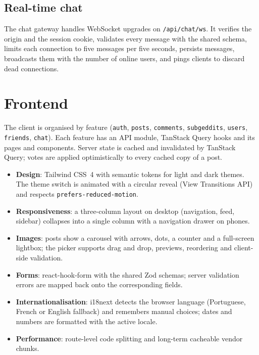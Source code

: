 \documentclass[11pt,a4paper]{article}
\begin{document}
\subsection{Real-time chat}

The chat gateway handles WebSocket upgrades on \texttt{/api/chat/ws}. It verifies the origin and the session cookie,
validates every message with the shared schema, limits each connection to five messages per five seconds,
persists messages, broadcasts them with the number of online users, and pings clients to discard dead connections.

\section{Frontend}

The client is organised by feature (\texttt{auth}, \texttt{posts}, \texttt{comments}, \texttt{subgeddits},
\texttt{users}, \texttt{friends}, \texttt{chat}). Each feature has an API module, TanStack Query hooks and its
pages and components. Server state is cached and invalidated by TanStack Query; votes are applied optimistically
to every cached copy of a post.

\begin{itemize}
  \item \textbf{Design}: Tailwind CSS~4 with semantic tokens for light and dark themes. The theme switch is
        animated with a circular reveal (View Transitions API) and respects \texttt{prefers-reduced-motion}.
  \item \textbf{Responsiveness}: a three-column layout on desktop (navigation, feed, sidebar) collapses into a
        single column with a navigation drawer on phones.
  \item \textbf{Images}: posts show a carousel with arrows, dots, a counter and a full-screen lightbox; the
        picker supports drag and drop, previews, reordering and client-side validation.
  \item \textbf{Forms}: react-hook-form with the shared Zod schemas; server validation errors are mapped back
        onto the corresponding fields.
  \item \textbf{Internationalisation}: i18next detects the browser language (Portuguese, French or English
        fallback) and remembers manual choices; dates and numbers are formatted with the active locale.
  \item \textbf{Performance}: route-level code splitting and long-term cacheable vendor chunks.
\end{itemize}
\end{document}
